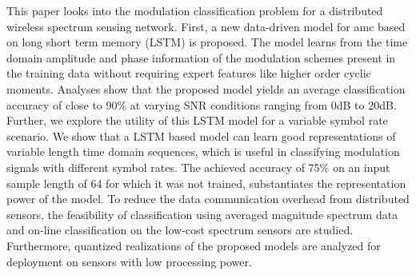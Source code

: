 This paper looks into the modulation classification problem for a distributed wireless spectrum sensing network. First, a new data-driven model for \ac{amc} based on long short term memory (LSTM) is proposed. The model learns from the time domain amplitude and phase information of the modulation schemes present in the training data without requiring expert features like higher order cyclic moments. Analyses show that the proposed model yields an average classification accuracy of close to 90\% at varying SNR conditions ranging from 0dB to 20dB. %
Further, we explore the utility of this LSTM model for a variable symbol rate scenario. We show that a LSTM based %
model can learn good representations of variable length time domain sequences, which is useful in classifying modulation signals with different symbol rates. The achieved accuracy of 75\% on an input sample length of 64 for which it was not trained, substantiates the representation power of the model. To reduce the data communication overhead from distributed sensors, the feasibility of classification using averaged magnitude spectrum data and on-line classification on the low-cost spectrum sensors are studied. %
Furthermore, quantized realizations of the proposed models are analyzed for deployment on sensors with low processing power.